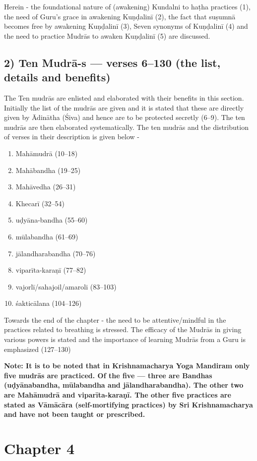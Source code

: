 Herein - the foundational nature of (awakening) Kundalni to haṭha practices (1), the need of Guru’s grace in awakening Kuṇḍalinī (2), the fact that suṣumnā becomes free by awakening Kuṇḍalinī (3), Seven synonyms of Kuṇḍalinī (4) and the need to practice Mudrās to awaken Kuṇḍalinī (5) are discussed. 

\subsection*{2) Ten Mudrā-s --- verses 6--130 (the list, details and benefits)}

The Ten mudrās are enlisted and elaborated with their benefits in this section. Initially the list of the mudrās are given and it is stated that these are directly given by Ādinātha (Śiva) and hence are to be protected secretly (6--9). The ten mudrās are then elaborated systematically. The ten  mudrās  and the distribution of verses in their description is given below -  

\begin{enumerate}
\item Mahāmudrā (10--18)
\item Mahābandha (19--25) 
\item Mahāvedha (26--31) 
\item Khecarī (32--54) 
\item uḍyāna-bandha (55--60)
\item mūlabandha (61--69)
\item jālandharabandha (70--76)
\item viparīta-karaṇī (77--82) 
\item vajorlī/sahajoil/amaroli (83--103) 
\item śakticālana (104--126)
\end{enumerate}

Towards the end of the chapter - the need to be attentive/mindful in the practices related to breathing is stressed. The efficacy of the Mudrās in giving various powers is stated and the importance of learning Mudrās from a Guru is emphasized (127--130) 

\textbf{Note: It is to be noted that in Krishnamacharya Yoga Mandiram only five mudrās are practiced. Of the five --- three are Bandhas (uḍyānabandha, mūlabandha and jālandharabandha). The other two are Mahāmudrā and viparīta-karaṇī. The other five practices are stated as Vāmācāra (self-mortifying practices) by Sri Krishnamacharya and have not been taught or prescribed.}

\section*{Chapter 4}

